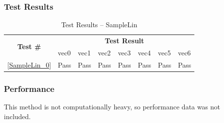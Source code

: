 \documentclass[12pt]{article}
\newcounter{TestCounter}
\begin{document}
	\subsubsection{Test Results}
		\begin{table}[H]
		\centering
		\caption{Test Results -- SampleLin}\label{SampleLin_acc}
		\begin{tabular}{clllllll}
		\toprule
		\multirow{2}{*}{\bf Test \#} & \multicolumn{7}{c}{\bf Test Result}\\
		& vec0 & vec1 & vec2 & vec3 & vec4 & vec5 & vec6\\\midrule
		\ref{SampleLin_0} & Pass & Pass & Pass & Pass & Pass & Pass & Pass\\
		\bottomrule
		\end{tabular}
		\end{table}

	\subsubsection{Performance}
		This method is not computationally heavy, so performance data was not included.
		
		
\end{document}
